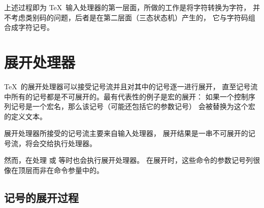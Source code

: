 \documentclass{book}
\begin{document}
上述过程即为 \TeX\ 输入处理器的第一层面，所做的工作是将字符转换为字符，
并不考虑类别码的问题，后者是在第二层面（三态状态机）产生的，
它与字符码组合成字符记号。

\section{展开处理器}

\TeX\ 的展开处理器可以接受记号流并且对其中的记号逐一进行展开，
直至记号流中所有的记号都是不可展开的。最有代表性的例子是宏的展开：
如果一个控制序列记号是一个宏名，那么该记号（可能还包括它的参数记号）%
会被替换为这个宏的定义文本。

展开处理器所接受的记号流主要来自输入处理器，
展开结果是一串不可展开的记号流，将会交给执行处理器。

然而，在处理  或  等时也会执行展开处理器。
在展开时，这些命令的参数记号列很像在顶层而非在命令参量中的。

\subsection{记号的展开过程}
\end{document}
